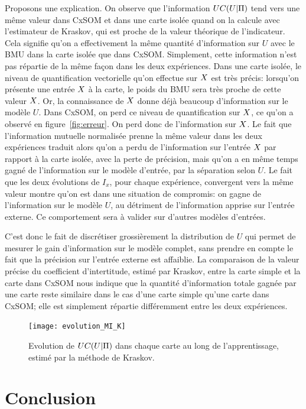 \documentclass[../main]{subfiles}
\begin{document}
Proposons une explication.
On observe que l'information $UC(U|\Pi)$ tend vers une même valeur dans CxSOM et dans une carte isolée quand on la calcule avec l'estimateur de Kraskov, qui est proche de la valeur théorique de l'indicateur. Cela signifie qu'on a effectivement la même quantité d'information sur $U$ avec le BMU dans la carte isolée que dans CxSOM. Simplement, cette information n'est pas répartie de la même façon dans les deux expériences.
Dans une carte isolée, le niveau de quantification vectorielle qu'on effectue sur $X$ est très précis: lorsqu'on présente une entrée $X$ à la carte, le poids du BMU sera très proche de cette valeur $X$. Or, la connaissance de $X$ donne déjà beaucoup d'information sur le modèle $U$.
Dans CxSOM, on perd ce niveau de quantification sur $X$, ce qu'on a observé en figure~\ref{fig:erreur}. On perd donc de l'information sur $X$. 
Le fait que l'information mutuelle normalisée prenne la même valeur dans les deux expériences traduit alors qu'on a perdu de l'information sur l'entrée $X$ par rapport à la carte isolée, avec la perte de précision, mais qu'on a en même temps gagné de l'information sur le modèle d'entrée, par la séparation selon $U$. Le fait que les deux évolutions de $I_x$, pour chaque expérience, convergent vers la même valeur montre qu'on est dans une situation de compromis: on gagne de l'information sur le modèle $U$, au détriment de l'information apprise sur l'entrée externe.
Ce comportement sera à valider sur d'autres modèles d'entrées.

C'est donc le fait de discrétiser grossièrement la distribution de $U$ qui permet de mesurer le gain d'information sur le modèle complet, sans prendre en compte le fait que la précision sur l'entrée externe est affaiblie. 
La comparaison de la valeur précise du coefficient d'intertitude, estimé par Kraskov, entre la carte simple et la carte dans CxSOM nous indique que la quantité d'information totale gagnée par une carte reste similaire dans le cas d'une carte simple qu'une carte dans CxSOM; elle est simplement répartie différemment entre les deux expériences.

\begin{figure}
\texttt{[image: evolution\_MI\_K]}
\caption{Evolution de $UC(U|\Pi)$ dans chaque carte au long de l'apprentissage, estimé par la méthode de Kraskov.\label{fig:MI_evol_total}}
\end{figure}
\section{Conclusion}
\end{document}
